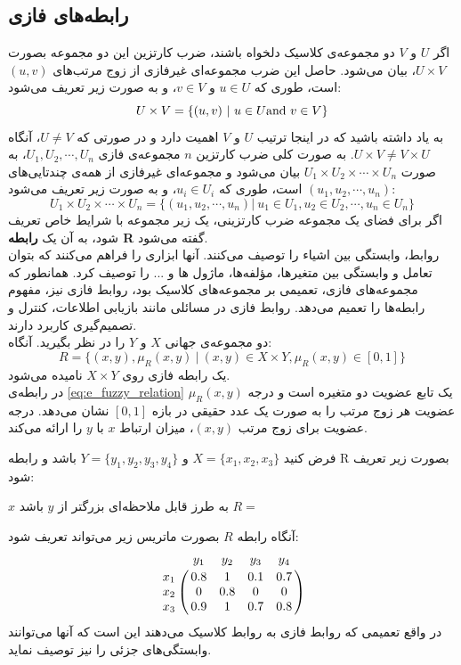  \subsection{رابطه‌های فازی}
 اگر $U$ و $V$ دو مجموعه‌ی کلاسیک دلخواه باشند، ضرب کارتزین 
 این دو مجموعه بصورت $U \times V$، بیان می‌شود. حاصل این ضرب مجموعه‌ای غیرفازی از زوج مرتب‌های $(u, v)$ است، طوری که $u \in U$ و $v \in V$، و به صورت زیر تعریف می‌شود:
 \begin{equation}\label{eq:e_fset_classic_cartesianproduct}
 	U \times V = \{(u, v)\ |\ u \in U {\rm and}\ v \in V \}
 \end{equation}
به یاد داشته باشید که در اینجا ترتیب $U$ و $V$ اهمیت دارد و در صورتی که $U \not = V$، آنگاه $U \times V \not = V \times U$. به صورت کلی ضرب کارتزین $n$ مجموعه‌ی فازی $U_1, U_2, \cdots, U_n$، به صورت $U_1 \times U_2 \times \cdots \times U_n$ بیان می‌شود و مجموعه‌ای غیرفازی از همه‌ی چندتایی‌های $(u_1, u_2, \cdots, u_n)$ است، طوری که $u_i \in U_i$، و به صورت زیر تعریف می‌شود:
 \begin{equation}\label{eq:e_fset_classic_cartesianproduct_general}
U_1 \times U_2 \times \cdots \times U_n = \{ (u_1, u_2, \cdots, u_n) |\ u_1 \in U_1, u_2 \in U_2, \cdots, u_n \in U_n\}
\end{equation}
اگر برای فضای یک مجموعه ضرب کارتزینی، یک زیر مجموعه با شرایط خاص تعریف شود، به آن یک \textbf{رابطه R}
گفته می‌شود. 
\cite{Wang1997}\\
روابط، وابستگی بین اشیاء را توصیف می‌کنند. آنها ابزاری را فراهم می‌کنند که بتوان تعامل و وابستگی بین متغیرها، مؤلفه‌ها، ماژول ها و ... را توصیف کرد. همانطور که مجموعه‌های فازی، تعمیمی بر مجموعه‌های کلاسیک بود، روابط فازی نیز، مفهوم رابطه‌ها را تعمیم می‌دهد. روابط فازی در مسائلی مانند بازیابی اطلاعات، کنترل و تصمیم‌گیری کاربرد دارند. 
\cite{Pedrycz2007} \\
دو مجموعه‌ی جهانی $X$ و $Y$ را در نظر بگیرید. آنگاه:
\begin{equation}\label{eq:e_fuzzy_relation}
	R = \{ (x,y), \mu_R(x,y)\ |\ (x,y) \in X \times Y, \mu_R(x,y) \in [0,1] \}
\end{equation}
یک رابطه فازی روی $X \times Y$ نامیده می‌شود.  \\
در رابطه‌ی
\ref{eq:e_fuzzy_relation}
$\mu_R(x,y)$
یک تابع عضویت دو متغیره است و درجه عضویت هر زوج مرتب را به صورت یک عدد حقیقی در بازه $[0,1]$ نشان می‌دهد.
درجه عضویت برای زوج مرتب $(x,y)$، میزان ارتباط $x$ با $y$ را ارائه می‌کند.
\begin{exmp}
	فرض کنید $X=\{x_1, x_2, x_3\}$ و $Y=\{y_1, y_2, y_3, y_4\}$ باشد و رابطه R بصورت زیر تعریف شود:

\begin{flushleft}
$x$ به طرز قابل ملاحظه‌ای بزرگتر از $y$ باشد $R =$ 
\end{flushleft}
آنگاه رابطه $R$ بصورت ماتریس زیر می‌تواند تعریف شود:
$$
\bordermatrix{&y_1&y_2&y_3&y_4 \cr
	x_1 & 0.8 & 1 & 0.1 & 0.7 \cr
	x_2 & 0 & 0.8 & 0 & 0 \cr
	x_3 & 0.9 & 1 & 0.7 & 0.8  }
$$
در واقع تعمیمی که روابط فازی به روابط کلاسیک می‌دهند این است که آنها می‌توانند وابستگی‌های جزئی را نیز توصیف نماید.
\end{exmp}

